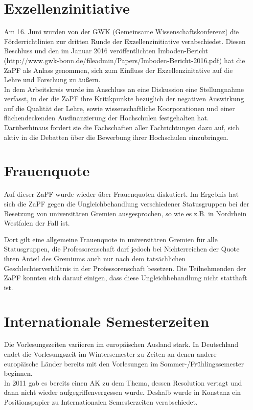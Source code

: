 \section*{Exzellenzinitiative}
Am 16. Juni wurden von der GWK (Gemeinsame Wissenschaftskonferenz) die Förderrichtlinien zur dritten Runde der Exzellenzinitiative verabschiedet. Diesen Beschluss und den im Januar 2016 veröffentlichten Imboden-Bericht (http://www.gwk-bonn.de/fileadmin/Papers/Imboden-Bericht-2016.pdf) hat die ZaPF als Anlass genommen, sich zum Einfluss der Exzellenzinitative auf die Lehre und Forschung zu äußern. \\
In dem Arbeitskreis wurde im Anschluss an eine Diskussion eine Stellungnahme verfasst, in der die ZaPF ihre Kritikpunkte bezüglich der negativen Auswirkung auf die Qualität der Lehre, sowie wissenschaftliche Koorporationen und einer flächendeckenden Ausfinanzierung der Hochschulen festgehalten hat. Darüberhinaus fordert sie die Fachschaften aller Fachrichtungen dazu auf, sich aktiv in die Debatten über die Bewerbung ihrer Hochschulen einzubringen. 

\section*{Frauenquote}

Auf dieser ZaPF wurde wieder über Frauenquoten diskutiert. Im Ergebnis hat sich die ZaPF gegen die Ungleichbehandlung verschiedener Statusgruppen bei der Besetzung von universitären Gremien ausgesprochen, so wie es z.B. in Nordrhein Westfalen der Fall ist. 

Dort gilt eine allgemeine Frauenquote in universitären Gremien für alle Statusgruppen, die  Professorenschaft darf jedoch bei Nichterreichen der Quote ihren Anteil des Gremiums auch nur nach dem tatsächlichen Geschlechterverhältnis in der Professorenschaft besetzen. Die Teilnehmenden der ZaPF konnten sich darauf einigen, dass diese Ungleichbehandlung nicht statthaft ist.

\section*{Internationale Semesterzeiten}
Die Vorlesungszeiten variieren im europäischen Ausland stark. In Deutschland endet die Vorlesungszeit im Wintersemester zu Zeiten an denen andere europäische Länder bereits mit den Vorlesungen im Sommer-/Frühlingssemester beginnen. \\
In 2011 gab es bereits einen AK zu dem Thema, dessen Resolution vertagt und dann nicht wieder aufgegriffenvergessen wurde. Deshalb wurde in Konstanz ein Positionspapier zu Internationalen Semesterzeiten verabschiedet.

